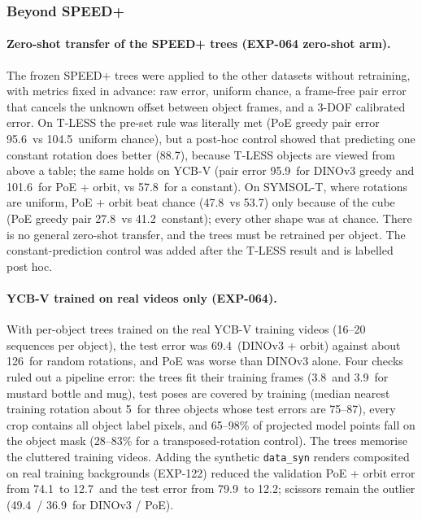 \subsubsection{Beyond SPEED+}\label{app:log_neg_xds}

\paragraph{Zero-shot transfer of the SPEED+ trees (EXP-064 zero-shot arm).}
The frozen SPEED+ trees were applied to the other datasets without retraining, with metrics fixed in advance: raw error, uniform chance, a frame-free pair error that cancels the unknown offset between object frames, and a 3-DOF calibrated error. On T-LESS the pre-set rule was literally met (PoE greedy pair error 95.6\appDdeg\ vs 104.5\appDdeg\ uniform chance), but a post-hoc control showed that predicting one constant rotation does better (88.7\appDdeg), because T-LESS objects are viewed from above a table; the same holds on YCB-V (pair error 95.9\appDdeg\ for DINOv3 greedy and 101.6\appDdeg\ for PoE + orbit, vs 57.8\appDdeg\ for a constant). On SYMSOL-T, where rotations are uniform, PoE + orbit beat chance (47.8\appDdeg\ vs 53.7\appDdeg) only because of the cube (PoE greedy pair 27.8\appDdeg\ vs 41.2\appDdeg\ constant); every other shape was at chance. There is no general zero-shot transfer, and the trees must be retrained per object. The constant-prediction control was added after the T-LESS result and is labelled post hoc.

\paragraph{YCB-V trained on real videos only (EXP-064).}
With per-object trees trained on the real YCB-V training videos (16--20 sequences per object), the test error was 69.4\appDdeg\ (DINOv3 + orbit) against about 126\appDdeg\ for random rotations, and PoE was worse than DINOv3 alone. Four checks ruled out a pipeline error: the trees fit their training frames (3.8\appDdeg\ and 3.9\appDdeg\ for mustard bottle and mug), test poses are covered by training (median nearest training rotation about 5\appDdeg\ for three objects whose test errors are 75--87\appDdeg), every crop contains all object label pixels, and 65--98\% of projected model points fall on the object mask (28--83\% for a transposed-rotation control). The trees memorise the cluttered training videos. Adding the synthetic \texttt{data\_syn} renders composited on real training backgrounds (EXP-122) reduced the validation PoE + orbit error from 74.1\appDdeg\ to 12.7\appDdeg\ and the test error from 79.9\appDdeg\ to 12.2\appDdeg; scissors remain the outlier (49.4\appDdeg\ / 36.9\appDdeg\ for DINOv3 / PoE).

